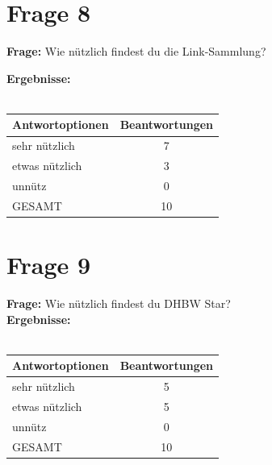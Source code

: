 \section{Frage 8 \label{frage08}}
\textbf{Frage:} Wie nützlich findest du die Link-Sammlung?
\begin{figure}
	\centering
\end{figure}
\textbf{Ergebnisse:}\\
\\
\begin{tabular}{|l|c|}\hline
	\textbf{Antwortoptionen} & \textbf{Beantwortungen} \\\hline
	sehr nützlich  	& 7 \\\hline
	etwas nützlich	& 3 \\\hline
	unnütz 			& 0 \\\hline
	GESAMT			& 10 \\\hline			
\end{tabular}

\section{Frage 9 \label{frage09}}
\begin{figure}
	\centering
\end{figure}

\textbf{Frage:} Wie nützlich findest du DHBW Star?\\
\textbf{Ergebnisse:}\\
\\
\begin{tabular}{|l|c|}\hline
	\textbf{Antwortoptionen} & \textbf{Beantwortungen} \\\hline
	sehr nützlich  	& 5 \\\hline
	etwas nützlich	& 5 \\\hline
	unnütz 			& 0 \\\hline
	GESAMT			& 10 \\\hline			
\end{tabular}

